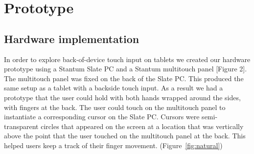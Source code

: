\section{Prototype}

\subsection{Hardware implementation}

In order to explore back-of-device touch input on tablets we created our hardware prototype using a Stantum Slate PC and a Stantum multitouch panel [Figure 2]. The multitouch panel was fixed on the back of the Slate PC. This produced the same setup as a tablet with a backside touch input. As a result we had a prototype that the user could hold with both hands wrapped around the sides, with fingers at the back. The user could touch on the multitouch panel to instantiate a corresponding cursor on the Slate PC. Cursors were semi-transparent circles that appeared on the screen at a location that was vertically above the point that the user touched on the multitouch panel at the back. This helped users keep a track of their finger movement. (Figure~\ref{fig:natural})

